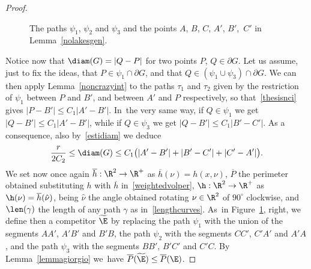 \begin{proof}
\begin{figure}[htbp]
\caption{The paths $\psi_1$, $\psi_2$ and $\psi_3$ and the points $A$, $B$, $C$, $A'$, $B'$,~$C'$ in Lemma~\ref{nolakesgen}.}\label{Fignolakes}
\end{figure}
Notice now that $\diam(G)=|Q-P|$ for two points $P$, $Q\in\partial G$. Let us assume, just to fix the ideas, that $P\in \psi_1\cap \partial G$, and that $Q\in(\psi_1\cup\psi_3)\cap\partial G$. We can then apply Lemma~\ref{noncrazyint} to the paths $\tau_1$ and $\tau_2$ given by the restriction of $\psi_1$ between $P$ and $B'$, and between $A'$ and $P$ respectively, so that~\eqref{thesisnci} gives $|P-B'| \leq C_1 |A'-B'|$. In~the very same way, if $Q\in \psi_1$ we get $|Q-B'|\leq C_1 |A'-B'|$, while if $Q\in\psi_3$ we get $|Q-B'|\leq C_1|B'-C'|$. As a consequence, also by~\eqref{estidiam} we deduce
\begin{equation}\label{pernotlo}
\frac r{2C_2} \leq \diam(G) \leq C_1\big(|A'-B'|+|B'-C'|+|C'-A'|\big).
\end{equation}
We set now once again $\overline h:\R^2\to\R^+$ as $\overline h(\nu)=h(x,\nu)$, $\overline P$ the perimeter obtained substituting $h$ with $\overline h$ in~\eqref{weightedvolper}, $\h:\R^2\to\R^+$ as $\h(\nu)=\overline h(\hat\nu)$, being $\hat\nu$ the angle obtained rotating $\nu\in\R^2$ of $90^\circ$ clockwise, and $\len(\gamma)$ the length of any path $\gamma$ as in~\eqref{lengthcurves}. As~in Figure~\ref{Fignolakes}, right, we define then a competitor $\widetilde \E$ by replacing the path $\psi_1$ with the union of the segments $AA'$, $ A'B'$ and $B'B$, the path $\psi_2$ with the segments $CC'$, $ C'A'$ and $A'A$, and the path $\psi_3$ with the segments $BB'$, $ B'C'$ and $C'C$. By Lemma~\ref{lemmagiorgio} we~have $\overline P(\widetilde \E) \leq \overline P(\E)$.


\end{proof}
